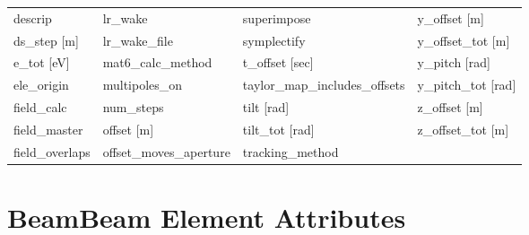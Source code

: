 \begin{tabular}{llll}
descrip                          & lr_wake                          & superimpose                      & y_offset [m]                     \\
ds_step [m]                      & lr_wake_file                     & symplectify                      & y_offset_tot [m]                 \\
e_tot [eV]                       & mat6_calc_method                 & t_offset [sec]                   & y_pitch [rad]                    \\
ele_origin                       & multipoles_on                    & taylor_map_includes_offsets      & y_pitch_tot [rad]                \\
field_calc                       & num_steps                        & tilt [rad]                       & z_offset [m]                     \\
field_master                     & offset [m]                       & tilt_tot [rad]                   & z_offset_tot [m]                 \\
field_overlaps                   & offset_moves_aperture            & tracking_method                  &                                  \\
 \bottomrule
 \end{tabular}
 \vfill
 
 \section{BeamBeam Element Attributes}
 \label{s:list.beambeam}
 
